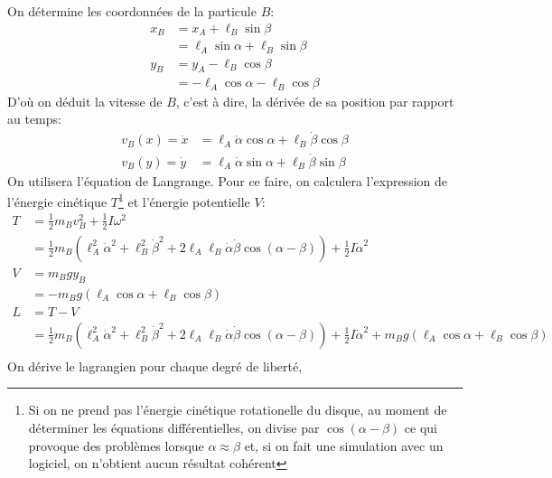 \documentclass[10pt]{article}
\begin{document}
On détermine les coordonnées de la particule $B$:
\begin{align*}
x_B &= x_A + \ell_B\sin{\beta} \\
	&= \ell_A\sin{\alpha} + \ell_B\sin{\beta} \\
y_B &= y_A - \ell_B\cos{\beta} \\
	&= -\ell_A\cos{\alpha} - \ell_B\cos{\beta}
\end{align*}
D'où on déduit la vitesse de $B$, c'est à dire, la dérivée de sa position par rapport au temps:
\begin{align*}
v_B(x) = \dot{x} &= \ell_A\dot{\alpha}\cos{\alpha} + \ell_B\dot{\beta}\cos{\beta} \\
v_B(y) = \dot{y} &= \ell_A\dot{\alpha}\sin{\alpha} + \ell_B\dot{\beta}\sin{\beta}
\end{align*}
On utilisera l'équation de Langrange. Pour ce faire, on calculera l'expression de l'énergie cinétique $T$\footnote{Si on ne prend pas l'énergie cinétique rotationelle du disque, au moment de déterminer les équations différentielles, on divise par $\cos{(\alpha-\beta)}$ ce qui provoque des problèmes lorsque $\alpha \approx \beta$ et, si on fait une simulation avec un logiciel, on n'obtient aucun résultat cohérent} et l'énergie potentielle $V$:
\begin{align*}
T &= \frac12m_Bv_B^2 + \frac12I\omega^2 \\
	&= \frac12m_B\left(\ell_A^2\dot{\alpha}^2+\ell_B^2\dot{\beta}^2+ 2\ell_A\ell_B\dot{\alpha}\dot{\beta}\cos{(\alpha-\beta)}\right) + \frac12I\dot{\alpha}^2 \\
V &= m_Bgy_B \\
	&= -m_Bg\left(\ell_A\cos{\alpha} + \ell_B\cos{\beta}\right) \\
L &= T-V \\
 &= \frac12m_B\left(\ell_A^2\dot{\alpha}^2+\ell_B^2\dot{\beta}^2+ 2\ell_A\ell_B\dot{\alpha}\dot{\beta}\cos{(\alpha-\beta)}\right) + \frac12I\dot{\alpha}^2 + m_Bg\left(\ell_A\cos{\alpha} + \ell_B\cos{\beta}\right) \\
\end{align*}
On dérive le lagrangien pour chaque degré de liberté,
\end{document}
